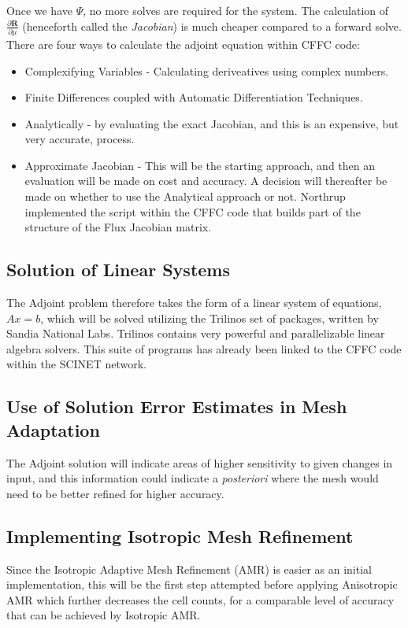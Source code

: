 Once we have $\Psi$, no more solves are required for the system. The calculation of $\frac{\partial \textbf{R}}{\partial \textbf{$\mu$}}$ (henceforth called the \textit{Jacobian}) is much cheaper compared to a forward solve. There are four ways to calculate the adjoint equation within CFFC code:
\begin{itemize}
\item Complexifying Variables - Calculating deriveatives using complex numbers.
\item Finite Differences coupled with Automatic Differentiation Techniques.
\item Analytically - by evaluating the exact Jacobian, and this is an expensive, but very accurate, process.
\item Approximate Jacobian - This will be the starting approach, and then an evaluation will be made on cost and accuracy. A decision will thereafter be made on whether to use the Analytical approach or not. Northrup \cite{Northrup:2013} implemented the script within the CFFC code that builds part of the structure of the Flux Jacobian matrix.
\end{itemize}

\subsection{Solution of Linear Systems}
The Adjoint problem therefore takes the form of a linear system of equations, $Ax=b$, which will be solved utilizing the Trilinos set of packages, written by Sandia National Labs. Trilinos contains very powerful and parallelizable linear algebra solvers. This suite of programs has already been linked to the CFFC code within the SCINET network.

\subsection{Use of Solution Error Estimates in Mesh Adaptation}
The Adjoint solution will indicate areas of higher sensitivity to given changes in input, and this information could indicate a \textit{posteriori} where the mesh would need to be better refined for higher accuracy.

\subsection{Implementing Isotropic Mesh Refinement}
Since the Isotropic Adaptive Mesh Refinement (AMR) is easier as an initial implementation, this will be the first step attempted before applying Anisotropic AMR which further decreases the cell counts, for a comparable level of accuracy that can be achieved by Isotropic AMR.

